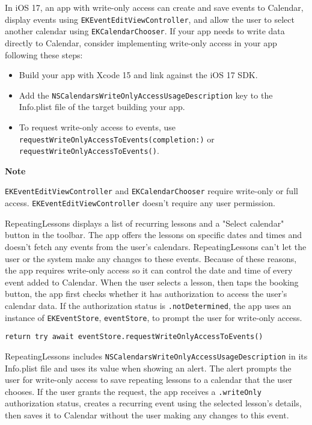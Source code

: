 \documentclass{article}
\begin{document}
In iOS 17, an app with write-only access can create and save events to Calendar, display events using \texttt{EKEventEditViewController}, and allow the user to select another calendar using \texttt{EKCalendarChooser}. If your app needs to write data directly to Calendar, consider implementing write-only access in your app following these steps:

\begin{itemize}
    \item Build your app with Xcode 15 and link against the iOS 17 SDK.
    \item Add the \texttt{NSCalendarsWriteOnlyAccessUsageDescription} key to the Info.plist file of the target building your app.
    \item To request write-only access to events, use \texttt{requestWriteOnlyAccessToEvents(completion:)} or \texttt{requestWriteOnlyAccessToEvents()}.
\end{itemize}

\textbf{Note}

\texttt{EKEventEditViewController} and \texttt{EKCalendarChooser} require write-only or full access. \texttt{EKEventEditViewController} doesn't require any user permission.

RepeatingLessons displays a list of recurring lessons and a "Select calendar" button in the toolbar. The app offers the lessons on specific dates and times and doesn't fetch any events from the user's calendars. RepeatingLessons can't let the user or the system make any changes to these events. Because of these reasons, the app requires write-only access so it can control the date and time of every event added to Calendar. When the user selects a lesson, then taps the booking button, the app first checks whether it has authorization to access the user's calendar data. If the authorization status is \texttt{.notDetermined}, the app uses an instance of \texttt{EKEventStore}, \texttt{eventStore}, to prompt the user for write-only access.

\texttt{return try await eventStore.requestWriteOnlyAccessToEvents()}

RepeatingLessons includes \texttt{NSCalendarsWriteOnlyAccessUsageDescription} in its Info.plist file and uses its value when showing an alert. The alert prompts the user for write-only access to save repeating lessons to a calendar that the user chooses. If the user grants the request, the app receives a \texttt{.writeOnly} authorization status, creates a recurring event using the selected lesson's details, then saves it to Calendar without the user making any changes to this event.
\end{document}
